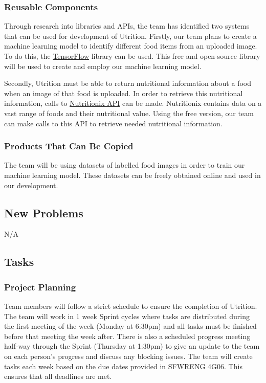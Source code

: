 \documentclass[12pt]{article}
\begin{document}
\subsubsection{Reusable Components}
Through research into libraries and APIs, the team has identified two systems that can be used for development of Utrition. Firstly, our team plans to create a machine learning model to identify different food items from an uploaded image. To do this, the \href{https://www.tensorflow.org/}{TensorFlow} library can be used. This free and open-source library will be used to create and employ our machine learning model.

Secondly, Utrition must be able to return nutritional information about a food when an image of that food is uploaded. In order to retrieve this nutritional information, calls to \href{https://www.nutritionix.com/business/api}{Nutritionix API} can be made. Nutritionix contains data on a vast range of foods and their nutritional value. Using the free version, our team can make calls to this API to retrieve needed nutritional information.

\subsubsection{Products That Can Be Copied}
The team will be using datasets of labelled food images in order to train our machine learning model. These datasets can be freely obtained online and used in our development.

\subsection{New Problems}
N/A

\subsection{Tasks}
\subsubsection{Project Planning}
Team members will follow a strict schedule to ensure the completion of Utrition. The team will work in 1 week Sprint cycles where tasks are distributed during the first meeting of the week (Monday at 6:30pm) and all tasks must be finished before that meeting the week after. There is also a scheduled progress meeting half-way through the Sprint (Thursday at 1:30pm) to give an update to the team on each person's progress and discuss any blocking issues. The team will create tasks each week based on the due dates provided in SFWRENG 4G06. This ensures that all deadlines are met.
\end{document}
